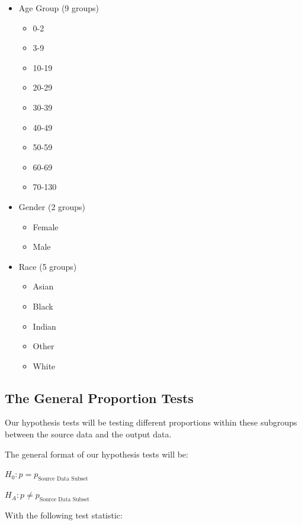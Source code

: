 \documentclass[
  letterpaper,
  DIV=11,
  numbers=noendperiod]{scrreprt}
\providecommand{\tightlist}{%
  \setlength{\itemsep}{0pt}\setlength{\parskip}{0pt}}\usepackage{longtable,booktabs,array}
\begin{document}
\begin{itemize}
\tightlist
\item
  Age Group (9 groups)

  \begin{itemize}
  \tightlist
  \item
    0-2
  \item
    3-9
  \item
    10-19
  \item
    20-29
  \item
    30-39
  \item
    40-49
  \item
    50-59
  \item
    60-69
  \item
    70-130
  \end{itemize}
\item
  Gender (2 groups)

  \begin{itemize}
  \tightlist
  \item
    Female
  \item
    Male
  \end{itemize}
\item
  Race (5 groups)

  \begin{itemize}
  \tightlist
  \item
    Asian
  \item
    Black
  \item
    Indian
  \item
    Other
  \item
    White
  \end{itemize}
\end{itemize}

\hypertarget{the-general-proportion-tests}{%
\subsection{The General Proportion
Tests}\label{the-general-proportion-tests}}

Our hypothesis tests will be testing different proportions within these
subgroups between the source data and the output data.

The general format of our hypothesis tests will be:

\(H_0: p = p_{\text{Source Data Subset}}\)

\(H_A: p \neq p_{\text{Source Data Subset}}\)

With the following test statistic:
\end{document}

